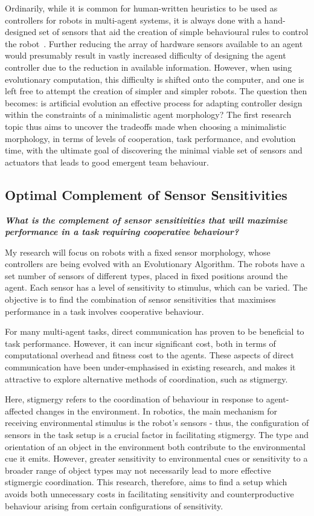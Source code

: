 \documentclass[a4paper,12pt]{article}
\begin{document}
Ordinarily, while it is common for human-written heuristics to be used as controllers for robots in multi-agent systems, it is always done with a hand-designed set of sensors that aid the creation of simple behavioural rules to control the robot~\cite{Jones03}. Further reducing the array of hardware sensors available to an agent would presumably result in vastly increased difficulty of designing the agent controller due to the reduction in available information.
However, when using evolutionary computation, this difficulty is shifted onto the computer, and one is left free to attempt the creation of simpler and simpler robots. The question then becomes: is artificial evolution an effective process for adapting controller design within the constraints of a minimalistic agent morphology? The first research topic thus aims to uncover the tradeoffs made when choosing a minimalistic morphology, in terms of levels of cooperation, task performance, and evolution time, with the ultimate goal of discovering the minimal viable set of sensors and actuators that leads to good emergent team behaviour.

\subsection{Optimal Complement of Sensor Sensitivities}

\textbf{ \textit {What is the complement of sensor sensitivities that will maximise performance in a task requiring cooperative behaviour?}}

My research will focus on robots with a fixed sensor morphology, whose controllers are being evolved with an Evolutionary Algorithm. The robots have a set number of sensors of different types, placed in fixed positions around the agent. Each sensor has a level of sensitivity to stimulus, which can be varied. The objective is to find the combination of sensor sensitivities that maximises performance in a task involves cooperative behaviour.

For many multi-agent tasks, direct communication has proven to be beneficial to task performance. However, it can incur significant cost, both in terms of computational overhead and fitness cost to the agents. These aspects of direct communication have been under-emphasised in existing research\cite{Wagner00}, and makes it attractive to explore alternative methods of coordination, such as stigmergy.

Here, stigmergy refers to the coordination of behaviour in response to agent-affected changes in the environment. In robotics, the main mechanism for receiving environmental stimulus is the robot’s sensors - thus, the configuration of sensors in the task setup is a crucial factor in facilitating stigmergy. The type and orientation of an object in the environment both contribute to the environmental cue it emits. However, greater sensitivity to environmental cues or sensitivity to a broader range of object types may not necessarily lead to more effective stigmergic coordination. This research, therefore, aims to find a setup which avoids both unnecessary costs in facilitating sensitivity and counterproductive behaviour arising from certain configurations of sensitivity.
\end{document}
